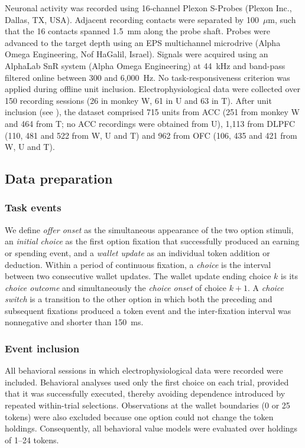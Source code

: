 \documentclass[pdflatex,sn-mathphys-num]{sn-jnl}%
\begin{document}
Neuronal activity was recorded using 16-channel Plexon S-Probes (Plexon Inc., Dallas, TX, USA). Adjacent recording contacts were separated by 100~$\mu$m, such that the 16 contacts spanned 1.5~mm along the probe shaft. Probes were advanced to the target depth using an EPS multichannel microdrive (Alpha Omega Engineering, Nof HaGalil, Israel). Signals were acquired using an AlphaLab SnR system (Alpha Omega Engineering) at 44~kHz and band-pass filtered online between 300 and 6,000~Hz. No task-responsiveness criterion was applied during offline unit inclusion. Electrophysiological data were collected over 150 recording sessions (26 in monkey W, 61 in U and 63 in T). After unit inclusion (see ), the dataset comprised 715 units from ACC (251 from monkey W and 464 from T; no ACC recordings were obtained from U), 1,113 from DLPFC (110, 481 and 522 from W, U and T) and 962 from OFC (106, 435 and 421 from W, U and T).

\subsection{Data preparation}

\subsubsection{Task events}\label{sec:m_events}
We define \emph{offer onset} as the simultaneous appearance of the two option stimuli, an \emph{initial choice} as the first option fixation that successfully produced an earning or spending event, and a \emph{wallet update} as an individual token addition or deduction. Within a period of continuous fixation, a \emph{choice} is the interval between two consecutive wallet updates. The wallet update ending choice $k$ is its \emph{choice outcome} and simultaneously the \emph{choice onset} of choice $k+1$. A \emph{choice switch} is a transition to the other option in which both the preceding and subsequent fixations produced a token event and the inter-fixation interval was nonnegative and shorter than 150~ms.

\subsubsection{Event inclusion}\label{sec:m_inclusion}
All behavioral sessions in which electrophysiological data were recorded were included. Behavioral analyses used only the first choice on each trial, provided that it was successfully executed, thereby avoiding dependence introduced by repeated within-trial selections. Observations at the wallet boundaries (0 or 25 tokens) were also excluded because one option could not change the token holdings. Consequently, all behavioral value models were evaluated over holdings of 1--24 tokens.
\end{document}
